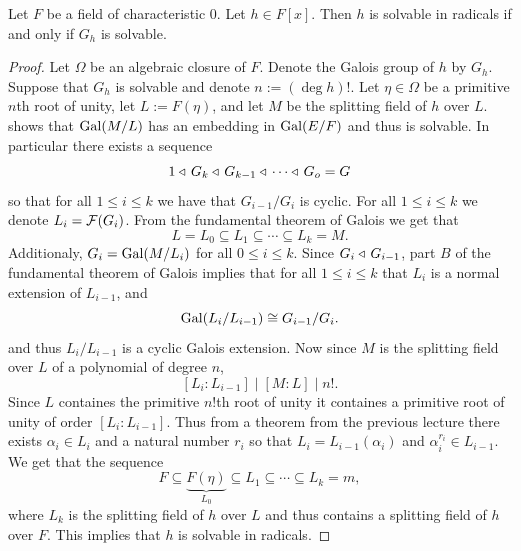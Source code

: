 \documentclass[11pt,a4paper]{article}
\begin{document}
\begin{theorem}
  Let $F$ be a field of characteristic $0$.
  Let $h \in F[x]$.
  Then $h$ is solvable in radicals if and only if $G_h$
  is solvable.
\end{theorem}
\begin{proof}
  Let $\Omega$ be an algebraic closure of $F$.
  Denote the Galois group of $h$ by $G_h$.
  Suppose that $G_h$ is solvable and denote $n := (\deg h)!$.
  Let $\eta \in \Omega$ be a primitive $n$th root of unity,
  let $L := F(\eta)$,
  and let $M$ be the splitting field of $h$ over $L$.
   shows that
  $\operatorname{Gal}(M/L)$ has an embedding in $\operatorname{Gal}(E/F)$ and thus is solvable.
  In particular there exists a sequence
  \[
    1 \triangleleft\, G_k \triangleleft\, G_{k-1} \triangleleft\, \cdots \triangleleft\, G_o = G
  \]
  so that for all $1 \le i \le k$ we have that $G_{i-1}/G_i$ is cyclic.
  For all $1 \le i \le k$ we denote $L_i = \mathcal F(G_i)$.
  From the fundamental theorem of Galois we get that
  \[
    L = L_0 \subseteq L_1 \subseteq \cdots \subseteq L_k = M.
  \]
  Additionaly, $G_i = \operatorname{Gal}(M/L_i)$ for all $0 \le i \le k$.
  Since $G_i \triangleleft\, G_{i-1}$,
  part $B$ of the fundamental theorem of Galois implies that for all
  $1 \le i \le k$ that $L_i$ is a normal extension of $L_{i-1}$,
  and
  \[
    \operatorname{Gal}(L_i/L_{i-1}) \cong G_{i-1} / G_i.
  \]
  and thus $L_i/L_{i-1}$ is a cyclic Galois extension.
  Now since $M$ is the splitting field over $L$ of a polynomial
  of degree $n$,
  \[
    [L_i : L_{i-1}] \mid [M : L] \mid n!.
  \]
  Since $L$ containes the primitive $n!$th root of unity
  it containes a primitive root of unity of order $[L_i : L_{i-1}]$.
  Thus from a theorem from the previous lecture there exists
  $\alpha_i \in L_i$ and a natural number $r_i$ so that
  $L_i = L_{i-1}(\alpha_i)$ and $\alpha_i^{r_i} \in L_{i-1}$.
  We get that the sequence
  \[
    F \subseteq \underbrace{F(\eta)}_{L_0}
      \subseteq L_1 \subseteq \cdots \subseteq L_k = m,
  \]
  where $L_k$ is the splitting field of $h$ over $L$
  and thus contains a splitting field of $h$ over $F$.
  This implies that $h$ is solvable in radicals.


\end{proof}
\end{document}
